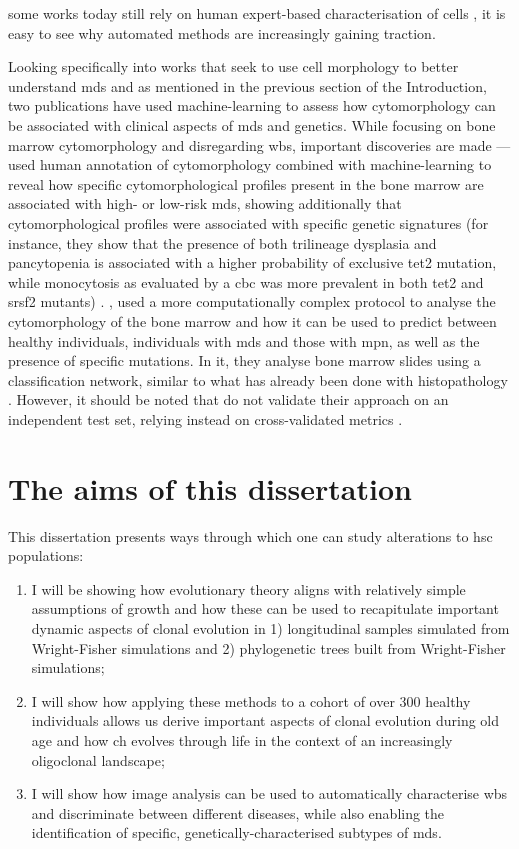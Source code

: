 some works today still rely on human expert-based characterisation of cells \cite{Nagata2020-lh}, it is easy to see why automated methods are increasingly gaining traction.

Looking specifically into works that seek to use cell morphology to better understand \ac{mds} and as mentioned in the previous section of the Introduction, two publications have used machine-learning to assess how cytomorphology can be associated with clinical aspects of \ac{mds} and genetics. While focusing on bone marrow cytomorphology and disregarding \ac{wbs}, important discoveries are made ---  used human annotation of cytomorphology combined with machine-learning to reveal how specific cytomorphological profiles present in the bone marrow are associated with high- or low-risk \ac{mds}, showing additionally that cytomorphological profiles were associated with specific genetic signatures (for instance, they show that the presence of both trilineage dysplasia and pancytopenia is associated with a higher probability of exclusive \ac{tet2} mutation, while monocytosis as evaluated by a \ac{cbc} was more prevalent in both \ac{tet2} and \ac{srsf2} mutants) \cite{Nagata2020-lh}. , used a more computationally complex protocol to analyse the cytomorphology of the bone marrow and how it can be used to predict between healthy individuals, individuals with \ac{mds} and those with \ac{mpn}, as well as the presence of specific mutations. In it, they analyse bone marrow slides using a classification network, similar to what has already been done with histopathology \cite{Fu2020-mx}. However, it should be noted that  do not validate their approach on an independent test set, relying instead on cross-validated metrics \cite{Bruck2021-fx}. 

\section{The aims of this dissertation}

This dissertation presents ways through which one can study alterations to \ac{hsc} populations:

\begin{enumerate}
	\item I will be showing how evolutionary theory aligns with relatively simple assumptions of growth and how these can be used to recapitulate important dynamic aspects of clonal evolution in 1) longitudinal samples simulated from Wright-Fisher simulations and 2) phylogenetic trees built from Wright-Fisher simulations;
	\item I will show how applying these methods to a cohort of over 300 healthy individuals allows us derive important aspects of clonal evolution during old age and how \ac{ch} evolves through life in the context of an increasingly oligoclonal landscape;
	\item I will show how image analysis can be used to automatically characterise \ac{wbs} and discriminate between different diseases, while also enabling the identification of specific, genetically-characterised subtypes of \ac{mds}.
\end{enumerate}